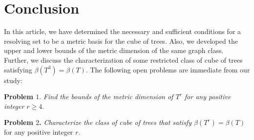 \documentclass{article}
\theoremstyle{definition}
\numberwithin{equation}{section}
\begin{document}
 \section{Conclusion}
In this article, we have determined the necessary and sufficient conditions for a resolving set to be a metric basis for the cube of trees. Also, we developed the upper and lower bounds of the metric dimension of the same graph class. Further, we discuss the characterization of some restricted class of cube of trees satisfying $\beta{(T^{3})}=\beta{(T)}$. The following open problems are immediate from our study:

\vspace{0.7em}
\textbf{Problem $1.$} \textit{Find the bounds of the metric dimension of $T^{r}$ for any positive integer $r\geq 4$}. 

\vspace{0.4em}
\textbf{Problem $2$.}\textit{ Characterize the class of cube of trees that satisfy $\beta{(T^{r})}=\beta{(T)}$} for any positive integer $r$. 
\end{document}
